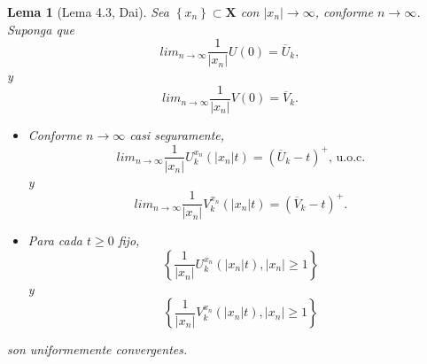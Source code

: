 \documentclass{article}
\newtheorem{Lema}{Lema}
\begin{document}
\begin{Lema}[Lema 4.3, Dai\cite{Dai}]\label{Lema.4.3}
Sea $\left\{x_{n}\right\}\subset \mathbf{X}$ con
$|x_{n}|\rightarrow\infty$, conforme $n\rightarrow\infty$. Suponga
que
\[lim_{n\rightarrow\infty}\frac{1}{|x_{n}|}U\left(0\right)=\overline{U}_{k},\]
y
\[lim_{n\rightarrow\infty}\frac{1}{|x_{n}|}V\left(0\right)=\overline{V}_{k}.\]
\begin{itemize}
\item[a)] Conforme $n\rightarrow\infty$ casi seguramente,
\[lim_{n\rightarrow\infty}\frac{1}{|x_{n}|}U^{x_{n}}_{k}\left(|x_{n}|t\right)=\left(\overline{U}_{k}-t\right)^{+}\textrm{, u.o.c.}\]
y
\[lim_{n\rightarrow\infty}\frac{1}{|x_{n}|}V^{x_{n}}_{k}\left(|x_{n}|t\right)=\left(\overline{V}_{k}-t\right)^{+}.\]

\item[b)] Para cada $t\geq0$ fijo,
\[\left\{\frac{1}{|x_{n}|}U^{x_{n}}_{k}\left(|x_{n}|t\right),|x_{n}|\geq1\right\}\]
y
\[\left\{\frac{1}{|x_{n}|}V^{x_{n}}_{k}\left(|x_{n}|t\right),|x_{n}|\geq1\right\}\]
\end{itemize}
son uniformemente convergentes.
\end{Lema}
\end{document}
